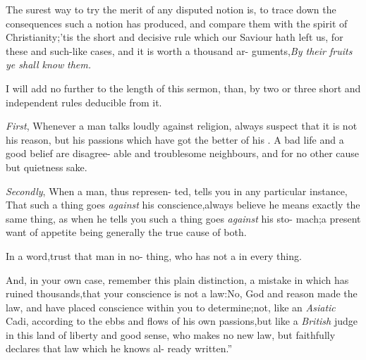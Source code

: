 \documentclass{article}
\begin{document}
\lqq The surest way to try the merit of\break
\lqq any disputed notion is, to trace down\break
\lqq the consequences such a notion has\break
\lqq produced, and compare them with the\break
\lqq spirit of Christianity;\tsh ’tis the short\break
\lqq and decisive rule which our Saviour\break
\lqq hath left us, for these and such-like\break
\lqq cases, and it is worth a thousand ar-\break
\lqq guments,\tsk \textit{By their fruits ye shall know}\break
\lqq \textit{them.} 

\lqq I will add no further to the length\break
\lqq of this sermon, than, by two or three
\lqq short and independent rules deducible\break
\lqq from it.

\lqq \textit{First}, Whenever a man talks loudly\break
\lqq against religion, always suspect that it\break
\lqq is not his reason, but his passions which\break
\lqq have got the better of his . A\break
\lqq bad life and a good belief are disagree-\break
\lqq able and troublesome neighbours, and\break
\lqq {}\break
\lqq for no other cause but quietness sake.

\lqq \textit{Secondly}, When a man, thus represen-\break
\lqq ted, tells you in any particular instance,\break
\lqq \tsk That such a thing goes \textit{against} his\break
\lqq conscience,\tsk always believe he means\break
\lqq exactly the same thing, as when he tells\break
\lqq you such a thing goes \textit{against} his sto-\break
\lqq mach;\tsk a present want of appetite\break
\lqq being generally the true cause of both.\\\newpage

\lqq In a word,\tsk trust that man in no-\break
\lqq thing, who has not a  in\break
\lqq every thing.

\lqq And, in your own case, remember\break
\lqq this plain distinction, a mistake in\break
\lqq which has ruined thousands,\tsk that\break
\lqq your conscience is not a law:\tsk No,\break
\lqq God and reason made the law, and\break
\lqq have placed conscience within you to\break
\lqq determine;\tsh not, like an \textit{Asiatic} Cadi,\break
\lqq according to the ebbs and flows of his\break
\lqq own passions,\tsk but like a \textit{British} judge\break
\lqq in this land of liberty and good sense,\break
\lqq who makes no new law, but faithfully\break
\lqq declares that law which he knows al-\break
\lqq ready written.”

\bigskip
\end{document}
